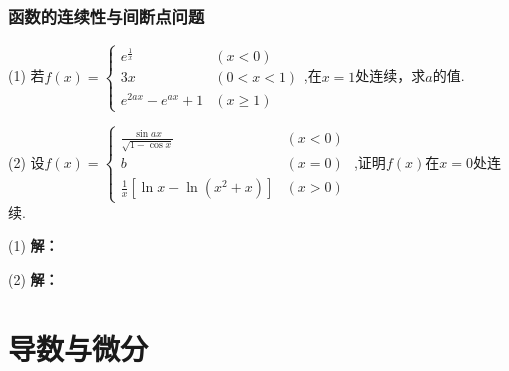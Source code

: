 \documentclass[12pt , a4paper , oneside]{ctexart}
\begin{document}
            \subsubsection{函数的连续性与间断点问题}
            (1) 若$f(x) = \begin{cases}
                e^{\frac{1}{x}} & (x < 0)\\
                3x & (0<x<1)\\
                e^{2ax} - e^{ax} + 1 & (x \geqslant 1)
            \end{cases}$,在$x=1$处连续，求$a$的值.

            (2) 设$f(x) = \begin{cases}
                \frac{\sin{ax}}{\sqrt{1-\cos{x}}} & (x < 0)\\
                b & (x = 0)\\
                \frac{1}{x} [ \ln{x}-\ln{(x^2 + x)} ] & (x > 0)\end{cases}$
                ,证明$f(x)$在$x=0$处连续.
            \begin{mdframed}
            (1) \textbf{解：}
            \end{mdframed}

            \begin{mdframed}
            (2) \textbf{解：}
            \end{mdframed}

    \section{导数与微分}
\end{document}
